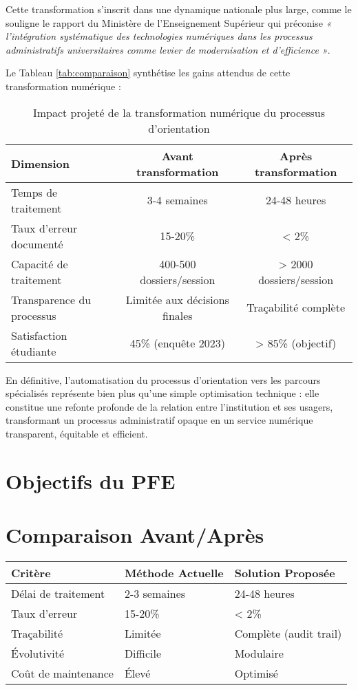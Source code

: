 \documentclass[french,12pt]{report} %
\begin{document}
Cette transformation s'inscrit dans une dynamique nationale plus large, comme le souligne le rapport du Ministère de l'Enseignement Supérieur \cite{MESRSFC2023} qui préconise \textit{« l'intégration systématique des technologies numériques dans les processus administratifs universitaires comme levier de modernisation et d'efficience »}.

Le Tableau \ref{tab:comparaison} synthétise les gains attendus de cette transformation numérique :

\begin{table}[H]
\centering
\begin{tabular}{lcc}
\toprule
\textbf{Dimension} & \textbf{Avant transformation} & \textbf{Après transformation} \\
\midrule
Temps de traitement & 3-4 semaines & 24-48 heures \\
Taux d'erreur documenté & 15-20\% & < 2\% \\
Capacité de traitement & 400-500 dossiers/session & > 2000 dossiers/session \\
Transparence du processus & Limitée aux décisions finales & Traçabilité complète \\
Satisfaction étudiante & 45\% (enquête 2023) & > 85\% (objectif) \\
\bottomrule
\end{tabular}
\caption{Impact projeté de la transformation numérique du processus d'orientation}
\label{tab:transformationimpact}
\end{table}

En définitive, l'automatisation du processus d'orientation vers les parcours spécialisés représente bien plus qu'une simple optimisation technique : elle constitue une refonte profonde de la relation entre l'institution et ses usagers, transformant un processus administratif opaque en un service numérique transparent, équitable et efficient.

\section{Objectifs du PFE}

\section{Comparaison Avant/Après}

\begin{longtabu} to \textwidth {|X[l]|X[c]|X[c]|}
\hline
\textbf{Critère} & \textbf{Méthode Actuelle} & \textbf{Solution Proposée} \\
\hline
\endhead
Délai de traitement & 2-3 semaines & 24-48 heures \\
\hline
Taux d'erreur & 15-20\% & < 2\% \\
\hline
Traçabilité & Limitée & Complète (audit trail) \\
\hline
Évolutivité & Difficile & Modulaire \\
\hline
Coût de maintenance & Élevé & Optimisé \\
\hline
\end{longtabu}
\end{document}
